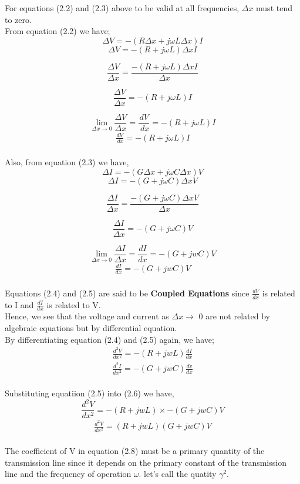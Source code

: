 	For equations (2.2) and (2.3) above to be valid at all frequencies, $ \Delta x $ must tend to zero.
	\\
	From equation (2.2) we have;
	\[ \Delta V = - (R \Delta x + j\omega L\Delta x)I \]
	\[ \Delta V = - (R + j\omega L)\Delta x I \]
	
\[ \frac{	\Delta V }{\Delta x} = \frac{ - (R  + j\omega L)\Delta x I}{\Delta x} \]

\[ \frac{	\Delta V }{\Delta x} =  - (R  + j\omega L) I \]
	
	\[ \lim_{ \Delta x\to 0} \frac{\Delta V}{ \Delta x} = \frac{ dV}{ \ dx} = - (R + j \omega L)I \]
	 \begin{align}
\frac{ dV}{ \ dx} = - (R + j \omega L)I 
	 \end{align} 
   \\
   Also, from equation (2.3) we have,
   	\[ \Delta I = - (G \Delta x + j\omega C\Delta x)V \]
   \[ \Delta I = - (G + j\omega C)\Delta x V \]
   
   \[ \frac{	\Delta I }{\Delta x} = \frac{ - (G + j\omega C)\Delta x V}{\Delta x} \]
   
   \[ \frac{	\Delta I }{\Delta x} =  - (G + j\omega C) V \]
   
    \[ \lim_{ \Delta x\to 0}	\frac{ \Delta I}{ \Delta x} = \frac{dI}{dx} = - (G + jwC)V \]
    \begin{align}
    \frac{dI}{dx} = - (G + jwC)V 
    \end{align}
	\\
	Equations (2.4) and (2.5) are said to be \textbf{Coupled Equations} since $ \frac{dV}{dx} $ is related to I and $ \frac{dI}{dx} $  is related to V. \\
	
	Hence, we see that the voltage and current as $ \Delta x \rightarrow $ 0 are not related by algebraic equations but by differential equation.
	\\
	By differentiating equation (2.4) and (2.5) again, we have; 
	 \begin{align}
	 \frac{d^{2}V}{dx^{2}} = - (R + jwL)\frac{dI}{dx} 
	 \end{align}
\begin{align}
\frac{d^{2}I}{dx^{2}} = - (G + jwC)\frac{dv}{dx}
\end{align}
\\
Substituting equatiion (2.5) into (2.6) we have,
\[ 	\frac{d^{2}V}{dx^{2}} = - (R + jwL)\times {- (G + jwC)V} \]
\begin{align}
 \frac{d^{2}V}{dx^{2}} = (R + jwL)(G + jwC)V 
\end{align}   
	\\
	The coefficient of V in equation (2.8) must be a primary quantity of the transmission line since it depends on the primary constant of the transmission line and the frequency of operation $ \omega . $ let's call the quatity $ \gamma^{2}. $ 
	
